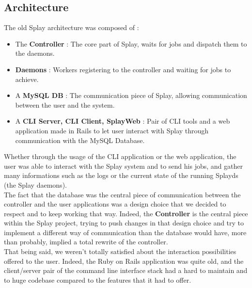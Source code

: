 \documentclass{eplmastersthesis}
\begin{document}
      \subsection{Architecture}

        The old Splay architecture was composed of :

        \begin{itemize}
          \item The \textbf{Controller} : The core part of Splay, waits for jobs
          and dispatch them to the daemons.
          \item \textbf{Daemons} : Workers registering to the controller and waiting
          for jobs to achieve.
          \item A \textbf{MySQL DB} : The communication piece of Splay, allowing
          communication between the user and the system.
          \item A \textbf{CLI Server, CLI Client, SplayWeb} : Pair of CLI tools
          and a web application made in Rails to let user interact with
          Splay through communication with the MySQL Database.
        \end{itemize}

        Whether through the usage of the CLI application or the web application,
        the user was able to interact with the Splay system and to send his
        jobs, and gather many informations such as the logs or the current
        state of the running Splayds (the Splay daemons).\\

        The fact that the database was the central piece of communication
        between the controller and the user applications was a design choice
        that we decided to respect and to keep working that way. Indeed, the
        \textbf{Controller} is the central piece within the Splay project,
        trying to push changes in that design choice and try to implement a
        different way of communication than the database would have, more
        than probably, implied a total rewrite of the controller.\\

        That being said, we weren't totally satisfied about the interaction
        possibilities offered to the user. Indeed, the Ruby on Rails application
        was quite old, and the client/server pair of the command line interface
        stack had a hard to maintain and to huge codebase compared to the
        features that it had to offer.\\
\end{document}
